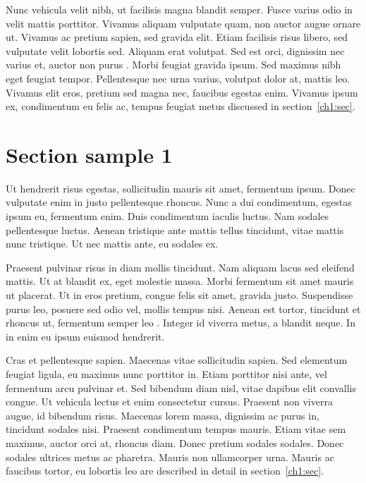 Nunc vehicula velit nibh, ut facilisis magna blandit semper. Fusce varius odio in velit mattis porttitor. Vivamus aliquam vulputate quam, non auctor augue ornare ut. Vivamus ac pretium sapien, sed gravida elit. Etiam facilisis risus libero, sed vulputate velit lobortis sed. Aliquam erat volutpat. Sed est orci, dignissim nec varius et, auctor non purus \cite{proceedings-minimal,phdthesis-full}. Morbi feugiat gravida ipsum. Sed maximus nibh eget feugiat tempor. Pellentesque nec urna varius, volutpat dolor at, mattis leo. Vivamus elit eros, pretium sed magna nec, faucibus egestas enim. Vivamus ipsum ex, condimentum eu felis ac, tempus feugiat metus discussed in section~\ref{ch1:sec}.

\section{Section sample 1}

Ut hendrerit risus egestas, sollicitudin mauris sit amet, fermentum ipsum. Donec vulputate enim in justo pellentesque rhoncus. Nunc a dui condimentum, egestas ipsum eu, fermentum enim. Duis condimentum iaculis luctus. Nam sodales pellentesque luctus. Aenean tristique ante mattis tellus tincidunt, vitae mattis nunc tristique. Ut nec mattis ante, eu sodales ex.

Praesent pulvinar risus in diam mollis tincidunt. Nam aliquam lacus sed eleifend mattis. Ut at blandit ex, eget molestie massa. Morbi fermentum sit amet mauris ut placerat. Ut in eros pretium, congue felis sit amet, gravida justo. Suspendisse purus leo, posuere sed odio vel, mollis tempus nisi. Aenean est tortor, tincidunt et rhoncus ut, fermentum semper leo \cite{book-crossref}. Integer id viverra metus, a blandit neque. In in enim eu ipsum euismod hendrerit.

Cras et pellentesque sapien. Maecenas vitae sollicitudin sapien. Sed elementum feugiat ligula, eu maximus nunc porttitor in. Etiam porttitor nisi ante, vel fermentum arcu pulvinar et. Sed bibendum diam nisl, vitae dapibus elit convallis congue. Ut vehicula lectus et enim consectetur cursus. Praesent non viverra augue, id bibendum risus. Maecenas lorem massa, dignissim ac purus in, tincidunt sodales nisi. Praesent condimentum tempus mauris. Etiam vitae sem maximus, auctor orci at, rhoncus diam. Donec pretium sodales sodales. Donec sodales ultrices metus ac pharetra. Mauris non ullamcorper urna. Mauris ac faucibus tortor, eu lobortis leo are described in detail in section~\ref{ch1:sec}.

